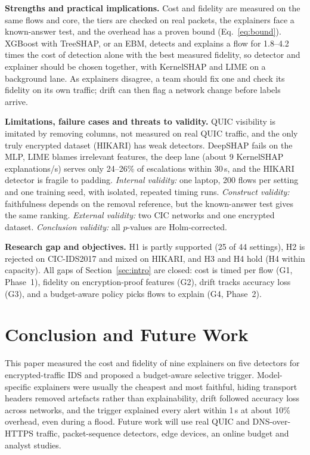 \documentclass[pdflatex,iicol,sn-mathphys-num]{sn-jnl}
\begin{document}
\textbf{Strengths and practical implications.} Cost and fidelity are measured on the same flows and core, the tiers are checked on real packets, the explainers face a known-answer test, and the overhead has a proven bound (Eq.~\ref{eq:bound}). XGBoost with TreeSHAP, or an EBM, detects and explains a flow for 1.8--4.2 times the cost of detection alone with the best measured fidelity, so detector and explainer should be chosen together, with KernelSHAP and LIME on a background lane. As explainers disagree, a team should fix one and check its fidelity on its own traffic; drift can then flag a network change before labels arrive.

\textbf{Limitations, failure cases and threats to validity.} QUIC visibility is imitated by removing columns, not measured on real QUIC traffic, and the only truly encrypted dataset (HIKARI) has weak detectors. DeepSHAP fails on the MLP, LIME blames irrelevant features, the deep lane (about 9 KernelSHAP explanations/s) serves only 24--26\% of escalations within 30\,s, and the HIKARI detector is fragile to padding. \emph{Internal validity:} one laptop, 200 flows per setting and one training seed, with isolated, repeated timing runs. \emph{Construct validity:} faithfulness depends on the removal reference, but the known-answer test gives the same ranking. \emph{External validity:} two CIC networks and one encrypted dataset. \emph{Conclusion validity:} all $p$-values are Holm-corrected.

\textbf{Research gap and objectives.} H1 is partly supported (25 of 44 settings), H2 is rejected on CIC-IDS2017 and mixed on HIKARI, and H3 and H4 hold (H4 within capacity). All gaps of Section~\ref{sec:intro} are closed: cost is timed per flow (G1, Phase~1), fidelity on encryption-proof features (G2), drift tracks accuracy loss (G3), and a budget-aware policy picks flows to explain (G4, Phase~2).

\section{Conclusion and Future Work}\label{sec:conclusion}

This paper measured the cost and fidelity of nine explainers on five detectors for encrypted-traffic IDS and proposed a budget-aware selective trigger. Model-specific explainers were usually the cheapest and most faithful, hiding transport headers removed artefacts rather than explainability, drift followed accuracy loss across networks, and the trigger explained every alert within 1\,s at about 10\% overhead, even during a flood. Future work will use real QUIC and DNS-over-HTTPS traffic, packet-sequence detectors, edge devices, an online budget and analyst studies.
\end{document}

